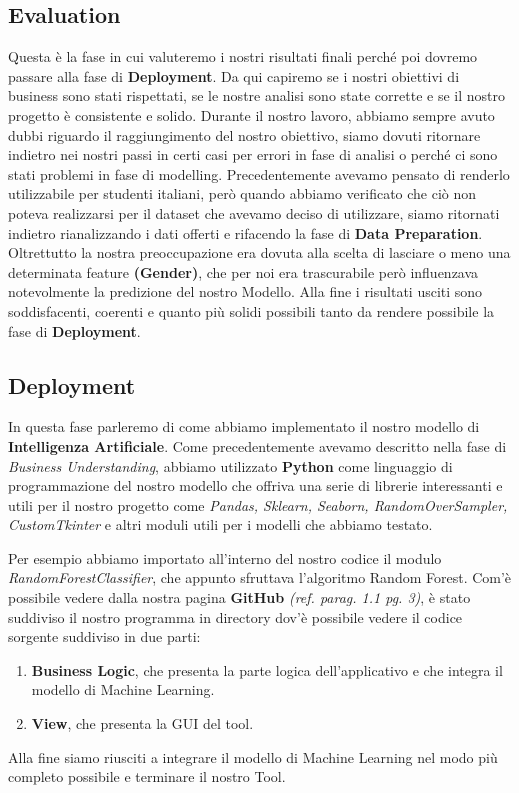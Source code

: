 \documentclass[12pt]{article}
\begin{document}
\subsection{Evaluation}
Questa è la fase in cui valuteremo i nostri risultati finali perché poi dovremo passare alla fase di \textbf{Deployment}. Da qui capiremo se i nostri obiettivi di business sono stati rispettati, se le nostre analisi sono state corrette e se il nostro progetto è consistente e solido.
Durante il nostro lavoro, abbiamo sempre avuto dubbi riguardo il raggiungimento del nostro obiettivo, siamo dovuti ritornare indietro nei nostri passi in certi casi per errori in fase di analisi o perché ci sono stati problemi in fase di modelling.
Precedentemente avevamo pensato di renderlo utilizzabile per studenti italiani, però quando abbiamo verificato che ciò non poteva realizzarsi per il dataset che avevamo deciso di utilizzare, siamo ritornati indietro rianalizzando i dati offerti e rifacendo la fase di \textbf{Data Preparation}.
Oltrettutto la nostra preoccupazione era dovuta alla scelta di lasciare o meno una determinata feature \textbf{(Gender)}, che per noi era trascurabile però influenzava notevolmente la predizione del nostro Modello. Alla fine i risultati usciti sono soddisfacenti, coerenti e quanto più solidi possibili tanto da rendere possibile la fase di \textbf{Deployment}.
\subsection{Deployment}
In questa fase parleremo di come abbiamo implementato il nostro modello di \textbf{Intelligenza Artificiale}.
Come precedentemente avevamo descritto nella fase di \textit{Business Understanding}, abbiamo utilizzato \textbf{Python} come linguaggio di programmazione del nostro modello che offriva una serie di librerie interessanti e utili per il nostro progetto come \textit{Pandas, Sklearn, Seaborn, RandomOverSampler, CustomTkinter} e altri moduli utili per i modelli che abbiamo testato.
\par
Per esempio abbiamo importato all'interno del nostro codice il modulo \textit{RandomForestClassifier}, che appunto sfruttava l'algoritmo Random Forest.
Com'è possibile vedere dalla nostra pagina \textbf{GitHub} \textit{(ref. parag. 1.1 pg. 3)}, è stato  suddiviso il nostro programma in directory dov'è possibile vedere il codice sorgente suddiviso in due parti:
\begin{enumerate}
    \item \textbf{Business Logic}, che presenta la parte logica dell'applicativo e che integra il modello di Machine Learning.
    \item \textbf{View}, che presenta la GUI del tool.
\end{enumerate}
Alla fine siamo riusciti a integrare il modello di Machine Learning nel modo più completo possibile e terminare il nostro Tool.
\end{document}
